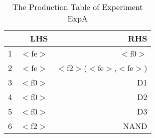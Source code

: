 \begin{table}[ht]
\centering
\begin{tabular}{rrr}
  \hline
 & LHS & RHS \\ 
  \hline
1 & $<$fe$>$ & $<$f0$>$ \\ 
  2 & $<$fe$>$ & $<$f2$>$($<$fe$>$,$<$fe$>$) \\ 
  3 & $<$f0$>$ & D1 \\ 
  4 & $<$f0$>$ & D2 \\ 
  5 & $<$f0$>$ & D3 \\ 
  6 & $<$f2$>$ & NAND \\ 
   \hline
\end{tabular}
\caption{The Production Table of Experiment ExpA} 
\end{table}
